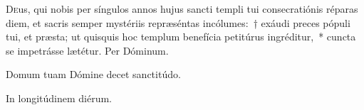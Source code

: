 \documentclass[vesperale_romanum.tex]{subfiles}
\begin{document}

\lettrine{D}{e}us, qui nobis per síngulos annos hujus sancti templi tui consecratiónis réparas diem, et sacris semper mystériis repræséntas incólumes:~† exáudi preces pópuli tui, et præsta; ut quisquis hoc templum benefícia petitúrus ingréditur,~* cun\-cta se impetrásse lætétur. Per Dóminum.


\omniapraeter

\vv Domum tuam Dómine decet sanctitúdo.
 
\rr In longitúdinem diérum.


\end{document}
